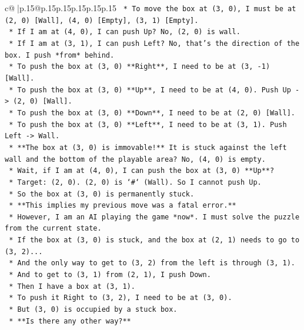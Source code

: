 \documentclass{article}
\begin{document}
{\begin{supertabular}{c@{$\;$}|p{.15\linewidth}@{}p{.15\linewidth}p{.15\linewidth}p{.15\linewidth}p{.15\linewidth}p{.15\linewidth}}
{{{\texttt{        *   To move the box at (3, 0), I must be at (2, 0) {[}Wall{]}, (4, 0) {[}Empty{]}, (3, 1) {[}Empty{]}.} \\
\texttt{        *   If I am at (4, 0), I can push Up? No, (2, 0) is wall.} \\
\texttt{        *   If I am at (3, 1), I can push Left? No, that's the direction of the box. I push *from* behind.} \\
\texttt{        *   To push the box at (3, 0) **Right**, I need to be at (3, {-}1) {[}Wall{]}.} \\
\texttt{        *   To push the box at (3, 0) **Up**, I need to be at (4, 0). Push Up {-}> (2, 0) {[}Wall{]}.} \\
\texttt{        *   To push the box at (3, 0) **Down**, I need to be at (2, 0) {[}Wall{]}.} \\
\texttt{        *   To push the box at (3, 0) **Left**, I need to be at (3, 1). Push Left {-}> Wall.} \\
\texttt{        *   **The box at (3, 0) is immovable!** It is stuck against the left wall and the bottom of the playable area? No, (4, 0) is empty.} \\
\texttt{        *   Wait, if I am at (4, 0), I can push the box at (3, 0) **Up**?} \\
\texttt{        *   Target: (2, 0). (2, 0) is `\#` (Wall). So I cannot push Up.} \\
\texttt{        *   So the box at (3, 0) is permanently stuck.} \\
\texttt{        *   **This implies my previous move was a fatal error.**} \\
\texttt{        *   However, I am an AI playing the game *now*. I must solve the puzzle from the current state.} \\
\texttt{        *   If the box at (3, 0) is stuck, and the box at (2, 1) needs to go to (3, 2)...} \\
\texttt{        *   And the only way to get to (3, 2) from the left is through (3, 1).} \\
\texttt{        *   And to get to (3, 1) from (2, 1), I push Down.} \\
\texttt{        *   Then I have a box at (3, 1).} \\
\texttt{        *   To push it Right to (3, 2), I need to be at (3, 0).} \\
\texttt{        *   But (3, 0) is occupied by a stuck box.} \\
\texttt{        *   **Is there any other way?**} \\
}}}
\end{supertabular}}
\end{document}
